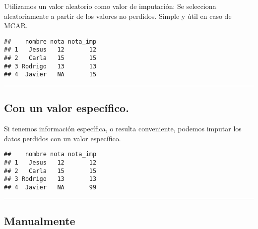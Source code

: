 \documentclass[
]{article}
\newenvironment{Shaded}{\begin{snugshade}}{\end{snugshade}}
\newcommand{\DecValTok}[1]{\textcolor[rgb]{0.00,0.00,0.81}{#1}}
\newcommand{\FunctionTok}[1]{\textcolor[rgb]{0.00,0.00,0.00}{#1}}
\newcommand{\NormalTok}[1]{#1}
\newcommand{\OtherTok}[1]{\textcolor[rgb]{0.56,0.35,0.01}{#1}}
\newcommand{\SpecialCharTok}[1]{\textcolor[rgb]{0.00,0.00,0.00}{#1}}
\newcommand{\StringTok}[1]{\textcolor[rgb]{0.31,0.60,0.02}{#1}}
\begin{document}
Utilizamos un valor aleatorio como valor de imputación: Se selecciona
aleatoriamente a partir de los valores no perdidos. Simple y útil en
caso de MCAR.

\begin{Shaded}
\end{Shaded}

\begin{verbatim}
##    nombre nota nota_imp
## 1   Jesus   12       12
## 2   Carla   15       15
## 3 Rodrigo   13       13
## 4  Javier   NA       15
\end{verbatim}

\begin{center}\rule{0.5\linewidth}{0.5pt}\end{center}

\hypertarget{con-un-valor-especuxedfico.}{%
\subsection{Con un valor
específico.}\label{con-un-valor-especuxedfico.}}

Si tenemos información específica, o resulta conveniente, podemos
imputar los datos perdidos con un valor específico.

\begin{Shaded}
\end{Shaded}

\begin{verbatim}
##    nombre nota nota_imp
## 1   Jesus   12       12
## 2   Carla   15       15
## 3 Rodrigo   13       13
## 4  Javier   NA       99
\end{verbatim}

\begin{center}\rule{0.5\linewidth}{0.5pt}\end{center}

\hypertarget{manualmente}{%
\subsection{Manualmente}\label{manualmente}}
\end{document}
